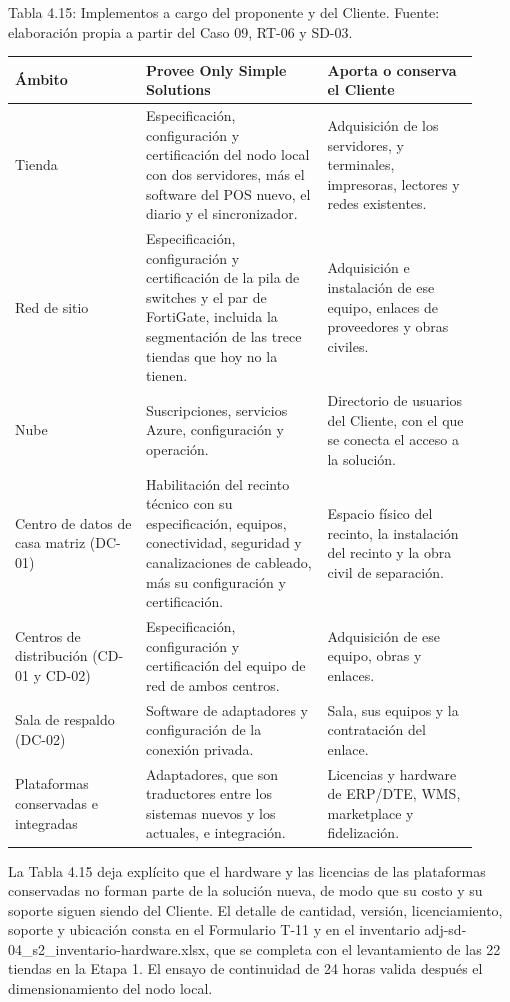 \documentclass[11pt]{article}
\begin{document}
Tabla 4.15: Implementos a cargo del proponente y del Cliente. Fuente: elaboración propia a partir del Caso 09, RT-06 y SD-03.\par\nopagebreak
\begin{longtable}{@{}p{0.26\linewidth}p{0.36\linewidth}p{0.30\linewidth}@{}}
\toprule Ámbito & Provee Only Simple Solutions & Aporta o conserva el Cliente \\
\midrule\endhead\bottomrule\endlastfoot
Tienda & Especificación, configuración y certificación del nodo local con dos servidores, más el software del POS nuevo, el diario y el sincronizador. & Adquisición de los servidores, y terminales, impresoras, lectores y redes existentes. \\
Red de sitio & Especificación, configuración y certificación de la pila de switches y el par de FortiGate, incluida la segmentación de las trece tiendas que hoy no la tienen. & Adquisición e instalación de ese equipo, enlaces de proveedores y obras civiles. \\
Nube & Suscripciones, servicios Azure, configuración y operación. & Directorio de usuarios del Cliente, con el que se conecta el acceso a la solución. \\
Centro de datos de casa matriz (DC-01) & Habilitación del recinto técnico con su especificación, equipos, conectividad, seguridad y canalizaciones de cableado, más su configuración y certificación. & Espacio físico del recinto, la instalación del recinto y la obra civil de separación. \\
Centros de distribución (CD-01 y CD-02) & Especificación, configuración y certificación del equipo de red de ambos centros. & Adquisición de ese equipo, obras y enlaces. \\
Sala de respaldo (DC-02) & Software de adaptadores y configuración de la conexión privada. & Sala, sus equipos y la contratación del enlace. \\
Plataformas conservadas e integradas & Adaptadores, que son traductores entre los sistemas nuevos y los actuales, e integración. & Licencias y hardware de ERP/DTE, WMS, marketplace y fidelización. \\
\end{longtable}

La Tabla 4.15 deja explícito que el hardware y las licencias de las plataformas conservadas no forman parte de la solución nueva, de modo que su costo y su soporte siguen siendo del Cliente. El detalle de cantidad, versión, licenciamiento, soporte y ubicación consta en el Formulario T-11 y en el inventario adj-sd-04\_s2\_inventario-hardware.xlsx, que se completa con el levantamiento de las 22 tiendas en la Etapa 1. El ensayo de continuidad de 24 horas valida después el dimensionamiento del nodo local.
\end{document}
